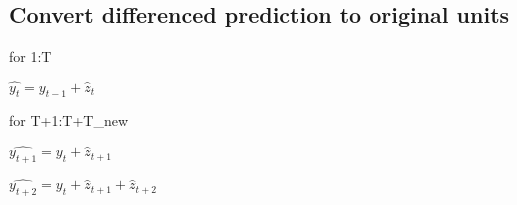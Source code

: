 \documentclass[11pt]{article}
\begin{document}
    \begin{center}
    \end{center}
    { \hspace*{\fill} \\}
    
    \subsection{Convert differenced prediction to original
units}\label{convert-differenced-prediction-to-original-units}

for 1:T

\(\hat{y_t} = y_{t-1}+\hat{z}_t\)

for T+1:T+T\_new

\(\hat{y_{t+1}} = y_t + \hat{z}_{t+1}\)

\(\hat{y_{t+2}} = y_t + \hat{z}_{t+1} + \hat{z}_{t+2}\)
\end{document}
